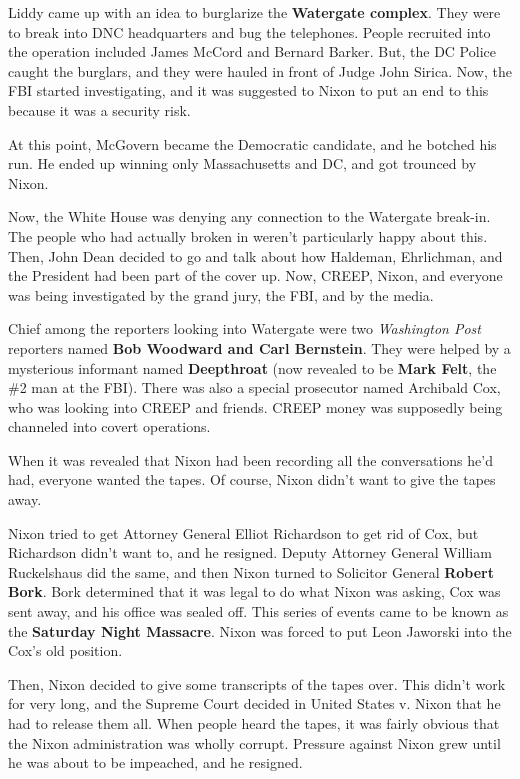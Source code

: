 Liddy came up with an idea to burglarize the \textbf{Watergate complex}.
They were to break into DNC headquarters and bug the telephones.
People recruited into the operation included James McCord and Bernard Barker.
But, the DC Police caught the burglars, and they were hauled in front of Judge John Sirica.
Now, the FBI started investigating,
and it was suggested to Nixon to put an end to this because it was a security risk.

At this point, McGovern became the Democratic candidate, and he botched his run.
He ended up winning only Massachusetts and DC, and got trounced by Nixon.

Now, the White House was denying any connection to the Watergate break-in.
The people who had actually broken in weren't particularly happy about this.
Then, John Dean decided to go and talk about how Haldeman, Ehrlichman,
and the President had been part of the cover up.
Now, CREEP, Nixon, and everyone was being investigated by the grand jury, the FBI, and by the media.

Chief among the reporters looking into Watergate were two \textit{Washington Post} reporters
named \textbf{Bob Woodward and Carl Bernstein}.
They were helped by a mysterious informant named \textbf{Deepthroat}
(now revealed to be \textbf{Mark Felt}, the \#2 man at the FBI).
There was also a special prosecutor named Archibald Cox, who was looking into CREEP and friends.
CREEP money was supposedly being channeled into covert operations.

When it was revealed that Nixon had been recording all the conversations he'd had,
everyone wanted the tapes.
Of course, Nixon didn't want to give the tapes away.

Nixon tried to get Attorney General Elliot Richardson to get rid of Cox,
but Richardson didn't want to, and he resigned.
Deputy Attorney General William Ruckelshaus did the same,
and then Nixon turned to Solicitor General \textbf{Robert Bork}.
Bork determined that it was legal to do what Nixon was asking, Cox was sent away, and his office was sealed off.
This series of events came to be known as the \textbf{Saturday Night Massacre}.
Nixon was forced to put Leon Jaworski into the Cox's old position.

Then, Nixon decided to give some transcripts of the tapes over.
This didn't work for very long,
and the Supreme Court decided in United States v. Nixon that he had to release them all.
When people heard the tapes, it was fairly obvious that the Nixon administration was wholly corrupt.
Pressure against Nixon grew until he was about to be impeached, and he resigned.

